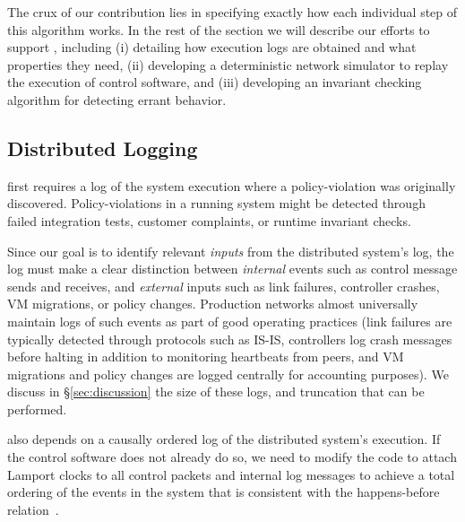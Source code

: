 The crux of our contribution lies in specifying exactly how each
individual step of this algorithm works. In the rest of the section we will
describe our efforts to support \simulator{}, including (i)
detailing how execution logs are obtained
and what properties they need, (ii) developing a deterministic network simulator
to replay the execution of control software, and (iii) developing an invariant
checking algorithm for detecting errant behavior.

\subsection{Distributed Logging}

\Simulator{} first requires a log of the system execution where a
policy-violation was originally discovered. Policy-violations
in a running system might be detected through failed integration tests,
customer complaints, or runtime invariant checks.

Since our goal is to identify
relevant {\em inputs} from the distributed system's log, the log must make a clear
distinction between {\em internal} events such as control message sends and
receives, and {\em external} inputs such as
link failures, controller crashes, VM migrations, or policy changes.
Production networks almost universally maintain logs of such events as part of
good operating practices (link failures are typically detected through
protocols such as IS-IS,
controllers log crash messages before
halting in addition to monitoring heartbeats from peers, and VM migrations and
policy changes are logged centrally for accounting purposes). We discuss in
\S\ref{sec:discussion} the size of these logs, and truncation that can be
performed. 

\Simulator{} also depends on a causally ordered log of the
distributed system's execution. If the control software does not already do
so, we need to modify the code to attach Lamport
clocks to all
control packets and internal log messages
to achieve a total ordering of the events in the system that
is consistent with the happens-before
relation~\cite{Lamport:1978:TCO:359545.359563}.


